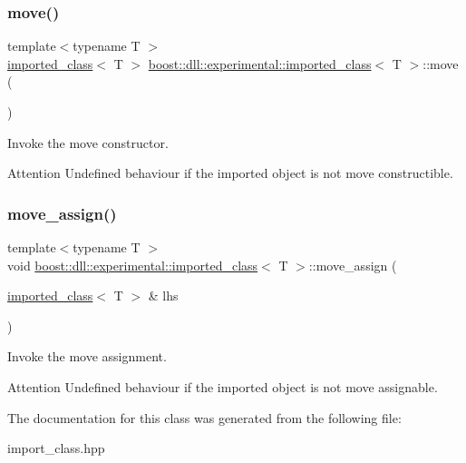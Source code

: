 \subsubsection{\texorpdfstring{move()}{move()}}
{\footnotesize\ttfamily template$<$typename T $>$ \\
\hyperlink{a01664}{imported\+\_\+class}$<$ T $>$ \hyperlink{a01664}{boost\+::dll\+::experimental\+::imported\+\_\+class}$<$ T $>$\+::move (\begin{DoxyParamCaption}{ }\end{DoxyParamCaption})\hspace{0.3cm}{\ttfamily [inline]}}



Invoke the move constructor. 

\begin{DoxyAttention}{Attention}
Undefined behaviour if the imported object is not move constructible. 
\end{DoxyAttention}
\mbox{\label{a01664_a0e6112cf988cbe0a2b05e0d5dc874a66}} 
\subsubsection{\texorpdfstring{move\+\_\+assign()}{move\_assign()}}
{\footnotesize\ttfamily template$<$typename T $>$ \\
void \hyperlink{a01664}{boost\+::dll\+::experimental\+::imported\+\_\+class}$<$ T $>$\+::move\+\_\+assign (\begin{DoxyParamCaption}\item[{\hyperlink{a01664}{imported\+\_\+class}$<$ T $>$ \&}]{lhs }\end{DoxyParamCaption})\hspace{0.3cm}{\ttfamily [inline]}}



Invoke the move assignment. 

\begin{DoxyAttention}{Attention}
Undefined behaviour if the imported object is not move assignable. 
\end{DoxyAttention}


The documentation for this class was generated from the following file\+:\begin{DoxyCompactItemize}
\item 
import\+\_\+class.\+hpp\end{DoxyCompactItemize}

